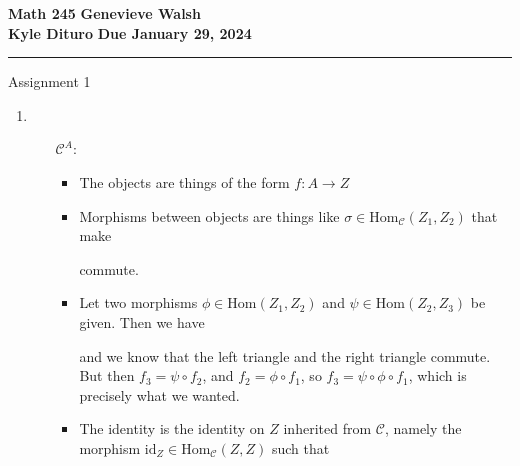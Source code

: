 \documentclass[12pt, twosided]{article}
\begin{document}
\noindent \textbf{Math 245} \hfill \textbf{Genevieve Walsh} \\
\textbf{Kyle Dituro} \hfill \textbf{Due January 29\tht, 2024}\hrule
\vspace{.2in}
\begin{center}
  \huge Assignment 1
\end{center}
\begin{enumerate}
\item
  \begin{itemize}
  \item [\(\mathcal{C}^A\):]
    \begin{itemize}
    \item The objects are things of the form \(f: A \to Z\)
    \item Morphisms between objects are things like \(\sigma \in \mathrm{Hom}_\mathcal{C} (Z_1,Z_2)\) that make
      \begin{center}
      \end{center}
      commute.
    \item Let two morphisms \(\phi \in \mathrm{Hom}(Z_1, Z_2)\) and \(\psi \in \mathrm{Hom}(Z_2, Z_3)\) be given. Then we have
      \begin{center}
      \end{center}
      and we know that the left triangle and the right triangle commute. But then \(f_3 = \psi \circ f_2\), and \(f_2 = \phi \circ f_1\), so \(f_3 = \psi \circ \phi \circ f_1\), which is precisely what we wanted.
    \item The identity is the identity on \(Z\) inherited from \(\mathcal{C}\), namely the morphism \(\mathrm{id}_Z \in \mathrm{Hom}_\mathcal{C}(Z, Z)\) such that
      \begin{center}

\end{center}
\end{itemize}
\end{itemize}
\end{enumerate}
\end{document}
